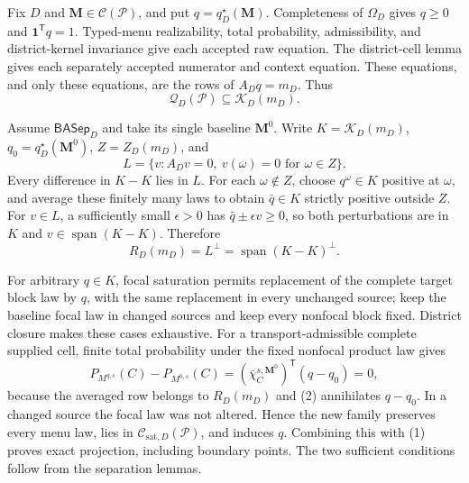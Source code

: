 Fix \(D\) and \(\mathbf M\in\mathcal C(\mathcal P)\), and put \(q=q_D^\star(\mathbf M)\).  Completeness of \(\Omega_D\) gives \(q\ge0\) and \(\mathbf1^{\mathsf T}q=1\).  Typed-menu realizability, total probability, admissibility, and district-kernel invariance give each accepted raw equation.  The district-cell lemma gives each separately accepted numerator and context equation.  These equations, and only these equations, are the rows of \(A_Dq=m_D\).  Thus
\[
\mathcal Q_D(\mathcal P)\subseteq\mathcal K_D(m_D).
\tag{1}
\]

Assume \(\mathsf{BASep}_D\) and take its single baseline \(\mathbf M^0\).  Write \(K=\mathcal K_D(m_D)\), \(q_0=q_D^\star(\mathbf M^0)\), \(Z=Z_D(m_D)\), and
\[
L=\{v:A_Dv=0,\ v(\omega)=0\text{ for }\omega\in Z\}.
\]
Every difference in \(K-K\) lies in \(L\).  For each \(\omega\notin Z\), choose \(q^\omega\in K\) positive at \(\omega\), and average these finitely many laws to obtain \(\bar q\in K\) strictly positive outside \(Z\).  For \(v\in L\), a sufficiently small \(\epsilon>0\) has \(\bar q\pm\epsilon v\ge0\), so both perturbations are in \(K\) and \(v\in\operatorname{span}(K-K)\).  Therefore
\[
R_D(m_D)=L^\perp=\operatorname{span}(K-K)^\perp.
\tag{2}
\]

For arbitrary \(q\in K\), focal saturation permits replacement of the complete target block law by \(q\), with the same replacement in every unchanged source; keep the baseline focal law in changed sources and keep every nonfocal block fixed.  District closure makes these cases exhaustive.  For a transport-admissible complete supplied cell, finite total probability under the fixed nonfocal product law gives
\[
P_{M^{q,s}}(C)-P_{M^{0,s}}(C)
=(\bar\chi_C^{s,\mathbf M^0})^{\mathsf T}(q-q_0)=0,
\tag{3}
\]
because the averaged row belongs to \(R_D(m_D)\) and (2) annihilates \(q-q_0\).  In a changed source the focal law was not altered.  Hence the new family preserves every menu law, lies in \(\mathcal C_{\mathrm{sat},D}(\mathcal P)\), and induces \(q\).  Combining this with (1) proves exact projection, including boundary points.  The two sufficient conditions follow from the separation lemmas.